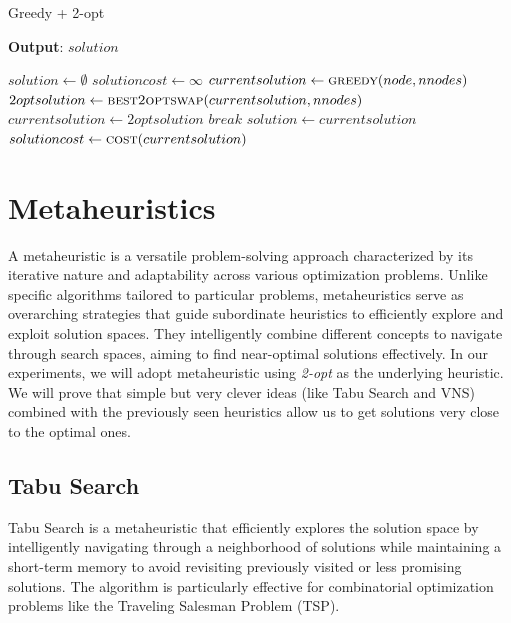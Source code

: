 \documentclass{article}
\begin{document}
\begin{algorithm}[ht]
\caption{Greedy + 2-opt}
\label{alg:greedy_2opt}
\hspace*{0.5em} \textbf{Output}: $solution$
\begin{algorithmic}
        \State $solution \gets \emptyset$
        \State $solutioncost \gets \infty$
                \State $currentsolution \gets \Call{greedy}{node, nnodes}$
                        \State $2optsolution \gets \Call{best2optswap}{currentsolution, nnodes}$
                                \State $currentsolution \gets 2optsolution$
                        \Else
                                \State $break$
                        \EndIf
                \EndWhile
                        \State $solution \gets currentsolution$
                        \State $solutioncost \gets \Call{cost}{currentsolution}$
                \EndIf
        \EndFor
\EndProcedure
\end{algorithmic}
\end{algorithm}

\clearpage

\section{Metaheuristics}
A metaheuristic is a versatile problem-solving approach characterized by its iterative nature and adaptability across various optimization problems. Unlike specific algorithms tailored to particular problems, metaheuristics serve as overarching strategies that guide subordinate heuristics to efficiently explore and exploit solution spaces. They intelligently combine different concepts to navigate through search spaces, aiming to find near-optimal solutions effectively.
In our experiments, we will adopt metaheuristic using \textit{2-opt} as the underlying
heuristic. We will prove that simple but very clever ideas (like Tabu Search and VNS) combined with the previously seen heuristics allow us to get solutions very close to the optimal ones.

\subsection{Tabu Search}
Tabu Search is a metaheuristic that efficiently explores the solution space by intelligently navigating through a neighborhood of solutions while maintaining a short-term memory to avoid revisiting previously visited or less promising solutions. The algorithm is particularly effective for combinatorial optimization problems like the Traveling Salesman Problem (TSP).
\end{document}
